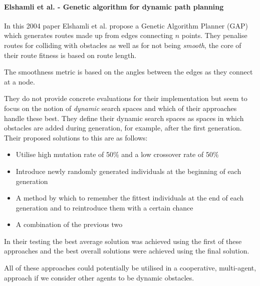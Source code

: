 \paragraph{Elshamli et al. - Genetic algorithm for dynamic path planning}\cite{elshamliGeneticAlgorithmDynamic2004}

In this 2004 paper Elshamli et al. propose a Genetic Algorithm Planner (GAP) which generates routes made up from edges connecting $n$ points. They penalise routes for colliding with obstacles as well as for not being \textit{smooth}, the core of their route fitness is based on route length.

The smoothness metric is based on the angles between the edges as they connect at a node.

They do not provide concrete evaluations for their implementation but seem to focus on the notion of \textit{dynamic} search spaces and which of their approaches handle these best. They define their dynamic search spaces as spaces in which obstacles are added during generation, for example, after the first generation. Their proposed solutions to this are as follows:

\begin{itemize}
  \item Utilise high mutation rate of 50\% and a low crossover rate of 50\%
  \item Introduce newly randomly generated individuals at the beginning of each generation
  \item A method by which to remember the fittest individuals at the end of each generation and to reintroduce them with a certain chance
  \item A combination of the previous two
\end{itemize}

In their testing the best average solution was achieved using the first of these approaches and the best overall solutions were achieved using the final solution.

All of these approaches could potentially be utilised in a cooperative, multi-agent, approach if we consider other agents to be dynamic obstacles.

